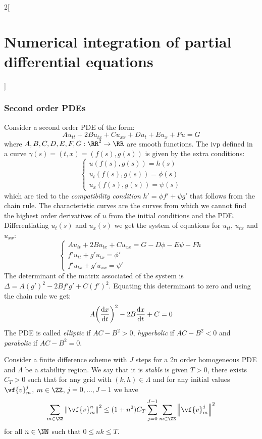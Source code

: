 \documentclass[../../../main_math.tex]{subfiles}
\begin{document}
\begin{multicols}{2}[\section{Numerical integration of partial differential equations}]
  \subsubsection{Second order PDEs}
  \begin{definition}
    Consider a second order PDE of the form:
    \begin{equation}
      A u_{tt}+2Bu_{tx} +Cu_{xx}+Du_t+Eu_x+F u=G
    \end{equation}
    where $A,B,C,D,E,F,G:\RR^2\rightarrow\RR$ are smooth functions. The ivp defined in a curve $\gamma(s)=(t,x)=(f(s),g(s))$ is given by the extra conditions:
    $$
      \begin{cases}
        u(f(s),g(s))=h(s)      \\
        u_t(f(s),g(s))=\phi(s) \\
        u_x(f(s),g(s))=\psi(s)
      \end{cases}
    $$
    which are tied to the \emph{compatibility condition} $h'=\phi f'+\psi g'$ that follows from the chain rule. The characteristic curves are the curves from which we cannot find the highest order derivatives of $u$ from the initial conditions and the PDE. Differentiating $u_t(s)$ and $u_x(s)$ we get the system of equations for $u_{tt}$, $u_{tx}$ and $u_{xx}$:
    \begin{equation*}
      \begin{cases}
        A u_{tt}+2Bu_{tx} +Cu_{xx}=G-D\phi-E\psi -Fh \\
        f'u_{tt}+g'u_{tx}=\phi'                      \\
        f'u_{tx}+g'u_{xx}=\psi'
      \end{cases}
    \end{equation*}
    The determinant of the matrix associated of the system is $\Delta=A{(g')}^2-2Bf'g'+C{(f')}^2$. Equating this determinant to zero and using the chain rule we get:
    $$
      A{\left(\dv{x}{t}\right)}^2-2B\dv{x}{t}+C=0
    $$
    The PDE is called \emph{elliptic} if $AC-B^2>0$, \emph{hyperbolic} if $AC-B^2<0$ and \emph{parabolic} if $AC-B^2=0$.
  \end{definition}
  \begin{definition}
    Consider a finite difference scheme with $J$ steps for a 2n order homogeneous PDE and $\Lambda$ be a stability region. We say that it is \emph{stable} is given $T>0$, there exists $C_T>0$ such that for any grid with $(k,h)\in \Lambda$ and for any initial values $\vf{v}_m^j$, $m\in\ZZ$, $j=0,\ldots,J-1$ we have $$\sum_{m\in\ZZ}\norm{\vf{v}_m^n}^2\leq (1+n^2)C_T\sum_{j=0}^{J-1}\sum_{m\in\ZZ}\norm{\vf{v}_m^j}^2$$ for all $n\in\NN$ such that $0\leq nk\leq T$.

\end{definition}
\end{multicols}
\end{document}
